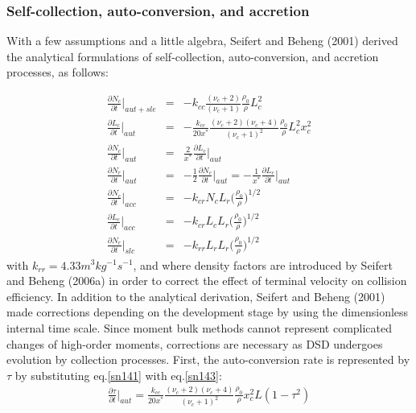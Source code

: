 \subsubsection{Self-collection, auto-conversion, and accretion}
With a few assumptions and a little algebra, Seifert and Beheng (2001) derived the analytical formulations of self-collection, auto-conversion, and accretion processes, as follows:

\begin{eqnarray}
\frac{\partial N_{c}}{\partial t}\Bigr|_{aut+sle}&=&-k_{cc}\frac{(\nu_{c}+2)}{(\nu_{c}+1)}\frac{\rho_{0}}{\rho}L_{c}^{2}\label{sn142}\\
\frac{\partial L_{c}}{\partial t}\Bigr|_{aut}&=&-\frac{k_{cc}}{20x^{*}}\frac{(\nu_{c}+2)(\nu_{c}+4)}{(\nu_{c}+1)^{2}}\frac{\rho_{0}}{\rho}L_{c}^{2}x_{c}^{2}\label{sn143}\\
\frac{\partial N_{c}}{\partial t}\Bigr|_{aut}&=&\frac{2}{x^{*}}\frac{\partial L_{c}}{\partial t}\Bigr|_{aut}\label{sn144}\\
\frac{\partial N_{r}}{\partial t}\Bigr|_{aut}&=&-\frac{1}{2}\frac{\partial N_{c}}{\partial t}\Bigr|_{aut}=-\frac{1}{x^{*}}\frac{\partial L_{c}}{\partial t}\Bigr|_{aut}\label{sn145}\\
\frac{\partial N_{c}}{\partial t}\Bigr|_{acc}&=&-k_{cr}N_{c}L_{r}\bigl(\frac{\rho_{0}}{\rho}\bigr)^{1/2}\label{sn146}\\
\frac{\partial L_{c}}{\partial t}\Bigr|_{acc}&=&-k_{cr}L_{c}L_{r}\bigl(\frac{\rho_{0}}{\rho}\bigr)^{1/2}\label{sn147}\\
\frac{\partial N_{r}}{\partial t}\Bigr|_{slc}&=&-k_{rr}L_{r}L_{r}\bigl(\frac{\rho_{0}}{\rho}\bigr)^{1/2}\label{sn148}
\end{eqnarray}
with $k_{rr} = 4.33 m^{3}kg^{-1}s^{-1}$, and where density factors are introduced by Seifert and Beheng (2006a) in order to correct the effect of terminal velocity on collision efficiency. In addition to the analytical derivation, Seifert and Beheng (2001) made corrections depending on the development stage by using the dimensionless internal time scale. Since moment bulk methods cannot represent complicated changes of high-order moments, corrections are necessary as DSD undergoes evolution by collection processes. First, the auto-conversion rate is represented by $\tau$ by substituting eq.\ref{sn141} with eq.\ref{sn143}:
\begin{eqnarray}
\frac{\partial \tau}{\partial t}\Bigr|_{aut}=\frac{k_{cc}}{20x^{*}}\frac{(\nu_{c}+2)(\nu_{c}+4)}{(\nu_{c}+1)^{2}}\frac{\rho_{0}}{\rho}x_{c}^{2}L(1-\tau^{2})\label{sn149}
\end{eqnarray}

